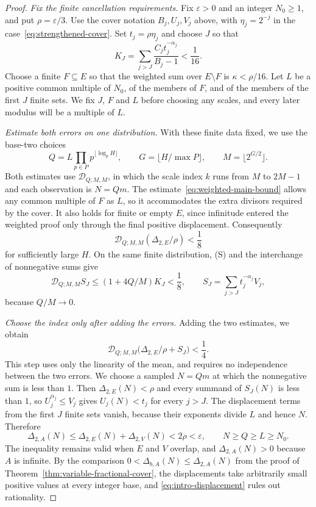 \documentclass[11pt]{article}
\begin{document}
\begin{proof}
\emph{Fix the finite cancellation requirements.}
Fix $\varepsilon>0$ and an integer $N_0\ge1$, and put $\rho=\varepsilon/3$.
Use the cover notation $B_j,U_j,V_j$ above, with $\eta_j=2^{-j}$ in
the case~\eqref{eq:strengthened-cover}.  Set $t_j=\rho\eta_j$ and choose
$J$ so that
\[
 K_J=\sum_{j>J}\frac{C_jt_j^{-\alpha_j}}{B_j-1}<\frac1{16}.
\]
Choose a finite $F\subseteq E$ so that the weighted sum over $E\setminus F$ is
$\kappa<\rho/16$. Let $L$ be a positive common multiple of $N_0$, of
the members of $F$, and of the members of the first $J$ finite sets.
We fix $J$, $F$ and $L$ before choosing any scales, and every later
modulus will be a multiple of $L$.

\emph{Estimate both errors on one distribution.}
With these finite data fixed, we use the base-two choices
\[
 Q=L\prod_{p\in P}p^{\lfloor\log_pH\rfloor},\qquad
 G=\lfloor H/\max P\rfloor,\qquad M=\lfloor2^{G/2}\rfloor.
\]
Both estimates use $\mathscr D_{Q;M,M}$, in which the scale index $k$
runs from $M$ to $2M-1$ and each observation is $N=Qm$. The
estimate~\eqref{eq:weighted-main-bound} allows any common multiple of
$F$ as $L$, so it accommodates the extra divisors required by the
cover. It also holds for finite or empty $E$, since infinitude entered
the weighted proof only through the final positive displacement.
Consequently
\[
 \mathscr D_{Q;M,M}(\Delta_{2,E}/\rho)<\frac18
\]
for sufficiently large $H$. On the same finite distribution, (S) and
the interchange of nonnegative sums give
\[
 \mathscr D_{Q;M,M}S_J\le(1+4Q/M)K_J<\frac18,
 \qquad S_J=\sum_{j>J}t_j^{-\alpha_j}V_j,
\]
because $Q/M\to0$.

\emph{Choose the index only after adding the errors.}
Adding the two estimates, we obtain
\[
 \mathscr D_{Q;M,M}\bigl(\Delta_{2,E}/\rho+S_J\bigr)<\frac14.
\]
This step uses only the linearity of the mean, and requires no
independence between the two errors. We choose a sampled $N=Qm$ at
which the nonnegative sum is less than $1$. Then
$\Delta_{2,E}(N)<\rho$ and every summand of $S_J(N)$ is less than $1$,
so $U_j^{\alpha_j}\le V_j$ gives $U_j(N)<t_j$ for every $j>J$. The
displacement terms from the first $J$ finite sets vanish, because their
exponents divide $L$ and hence $N$. Therefore
\[
 \Delta_{2,A}(N)\le\Delta_{2,E}(N)+\Delta_{2,V}(N)<2\rho<\varepsilon,
 \qquad N\ge Q\ge L\ge N_0.
\]
The inequality remains valid when $E$ and $V$ overlap, and
$\Delta_{2,A}(N)>0$ because $A$ is infinite. By the comparison
$0<\Delta_{b,A}(N)\le\Delta_{2,A}(N)$ from the proof of
Theorem~\ref{thm:variable-fractional-cover}, the displacements take
arbitrarily small positive values at every integer base, and
\eqref{eq:intro-displacement} rules out rationality.
\end{proof}
\end{document}
